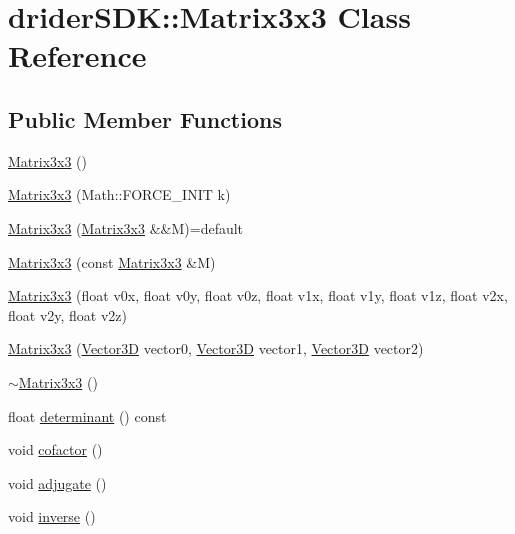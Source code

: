 \hypertarget{classdrider_s_d_k_1_1_matrix3x3}{}\section{drider\+S\+DK\+:\+:Matrix3x3 Class Reference}
\label{classdrider_s_d_k_1_1_matrix3x3}
\subsection*{Public Member Functions}
\begin{DoxyCompactItemize}
\item 
\hyperlink{classdrider_s_d_k_1_1_matrix3x3_af68125272dae7e0632274e8dce60fdba}{Matrix3x3} ()
\item 
\hyperlink{classdrider_s_d_k_1_1_matrix3x3_a62fc5446a36d8adfbd91efdebfef60e7}{Matrix3x3} (Math\+::\+F\+O\+R\+C\+E\+\_\+\+I\+N\+IT k)
\item 
\hyperlink{classdrider_s_d_k_1_1_matrix3x3_a7abf818a993ac00fddf76b850cc9c089}{Matrix3x3} (\hyperlink{classdrider_s_d_k_1_1_matrix3x3}{Matrix3x3} \&\&M)=default
\item 
\hyperlink{classdrider_s_d_k_1_1_matrix3x3_a4ec74c1bdbbb648be2add2303e2ed7ac}{Matrix3x3} (const \hyperlink{classdrider_s_d_k_1_1_matrix3x3}{Matrix3x3} \&M)
\item 
\hyperlink{classdrider_s_d_k_1_1_matrix3x3_a9e6b1feddeca489413a4b0e245fd065a}{Matrix3x3} (float v0x, float v0y, float v0z, float v1x, float v1y, float v1z, float v2x, float v2y, float v2z)
\item 
\hyperlink{classdrider_s_d_k_1_1_matrix3x3_a6db26006022be6284d7ad7d529df2abc}{Matrix3x3} (\hyperlink{classdrider_s_d_k_1_1_vector3_d}{Vector3D} vector0, \hyperlink{classdrider_s_d_k_1_1_vector3_d}{Vector3D} vector1, \hyperlink{classdrider_s_d_k_1_1_vector3_d}{Vector3D} vector2)
\item 
\hyperlink{classdrider_s_d_k_1_1_matrix3x3_aeb17fd79d03963ed1a4d7893005829e1}{$\sim$\+Matrix3x3} ()
\item 
float \hyperlink{classdrider_s_d_k_1_1_matrix3x3_a5f9caa3838c81426ab99b408de64a3dd}{determinant} () const
\item 
void \hyperlink{classdrider_s_d_k_1_1_matrix3x3_a27658d6187c0b87a82b1e85b77da9006}{cofactor} ()
\item 
void \hyperlink{classdrider_s_d_k_1_1_matrix3x3_aa93d14c1c1ad6755c8dff78a41081107}{adjugate} ()
\item 
void \hyperlink{classdrider_s_d_k_1_1_matrix3x3_a5ae1cea03a321e9f9ce5ef4a409bf89a}{inverse} ()

\end{DoxyCompactItemize}

